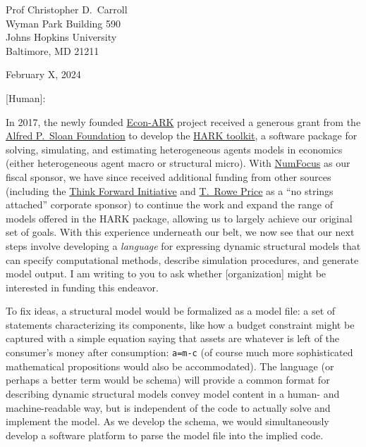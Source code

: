 \documentclass[11pt,pdftex,letterpaper]{article}
\begin{document}
	
\begin{singlespace}
	Prof Christopher D.\ Carroll \\
	Wyman Park Building 590 \\
	Johns Hopkins University \\
	Baltimore, MD 21211
	
	\vspace{0.2cm}
	
	February X, 2024
	
\end{singlespace}

\vspace{0.3cm}

[Human]:

In 2017, the newly founded \href{http://www.econ-ark.org}{Econ-ARK} project received a generous grant from the \href{https://sloan.org}{Alfred P.\ Sloan Foundation} to develop the \href{https://github.com/econ-ark/HARK}{HARK toolkit}, a software package for solving, simulating, and estimating heterogeneous agents models in economics (either heterogeneous agent macro or structural micro). With \href{https://numfocus.org/}{NumFocus} as our fiscal sponsor, we have since received additional funding from other sources (including the \href{https://inomics.com/institution/think-forward-initiative-1258337}{Think Forward Initiative} and \href{https://www.troweprice.com/en}{T.\ Rowe Price} as a ``no strings attached'' corporate sponsor) to continue the work and expand the range of models offered in the HARK package, allowing us to largely achieve our original set of goals. With this experience underneath our belt, we now see that our next steps involve developing a \textit{language} for expressing dynamic structural models that can specify computational  methods, describe simulation procedures, and generate model output. I am writing to you to ask whether [organization] might be interested in funding this endeavor.

To fix ideas, a structural model would be formalized as a model file: a set of statements characterizing its components, like how a budget constraint might be captured with a simple equation saying that assets are whatever is left of the consumer's money after consumption: \texttt{a=m-c} (of course much more sophisticated mathematical propositions would also be accommodated).  The language (or perhaps a better term would be schema) will provide a common format for describing dynamic structural models convey model content in a human- and machine-readable way, but is independent of the code to actually solve and implement the model. As we develop the schema, we would simultaneously develop a software platform to parse the model file into the implied code. 
\end{document}

